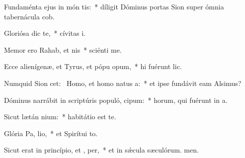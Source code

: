 \item Fundaménta ejus in món tis:~* díligit Dóminus portas Sion super ómnia tabernácula cob.
\item Gloriósa dic   te,~* cívitas i.
\item Memor ero Rahab, et nis~* sciénti me.
\item Ecce alienígenæ, et Tyrus, et pópu opum,~* hi fuérunt lic.
\item Numquid Sion cet:~\pscross{} Homo, et homo natus   a:~* et ipse fundávit eam Alsimus?
\item Dóminus narrábit in scriptúris populó,  cipum:~* horum, qui fuérunt in a.
\item Sicut lætán nium:~* habitátio est  te.
\item Glória Pa,  lio,~* et Spirítui to.
\item Sicut erat in princípio, et ,  per,~* et in sǽcula sæculórum. men.
